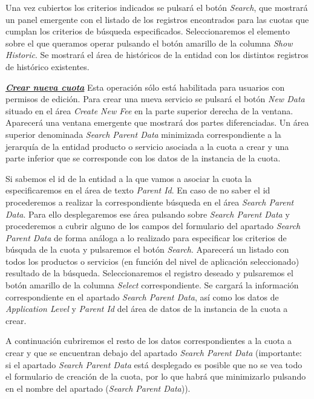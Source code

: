 Una vez cubiertos los criterios indicados se pulsará el botón \emph{Search}, que mostrará un panel emergente con el listado de los registros encontrados para las cuotas que cumplan los criterios de búsqueda especificados. Seleccionaremos el elemento sobre el que queramos operar pulsando el botón amarillo de la columna \emph{Show Historic}. Se mostrará el área de históricos de la entidad con los distintos registros de histórico existentes.


\underline{\textsl{\textbf{Crear nueva cuota}}}\newline
Esta operación sólo está habilitada para usuarios con permisos de edición.
Para crear una nueva servicio se pulsará el botón \textit{New Data} situado en el área \emph{Create New Fee} en la parte superior derecha de la ventana. Aparecerá una ventana emergente que mostrará dos partes diferenciadas. Un área superior denominada \emph{Search Parent Data} minimizada correspondiente a la jerarquía de la entidad producto o servicio asociada a la cuota a crear y una parte inferior que se corresponde con los datos de la instancia de la cuota.

Si sabemos el id de la entidad a la que vamos a asociar la cuota la especificaremos en el área de texto \emph{Parent Id}. En caso de no saber el id procederemos a realizar la correspondiente búsqueda en el área  \emph{Search Parent Data}. Para ello desplegaremos ese área pulsando sobre \emph{Search Parent Data} y procederemos a cubrir alguno de los campos del formulario del apartado \emph{Search Parent Data} de forma análoga a lo realizado para especificar los criterios de búsquda de la cuota y pulsaremos el botón \emph{Search}. Aparecerá un listado con todos los productos o servicios (en función del nivel de aplicación seleccionado) resultado de la búsqueda. Seleccionaremos el registro deseado y pulsaremos el botón amarillo de la columna \emph{Select} correspondiente. Se cargará la información correspondiente en el apartado \emph{Search Parent Data}, así como los datos de \emph{Application Level} y \emph{Parent Id} del área de datos de la instancia de la cuota a crear.

A continuación cubriremos el resto de los datos correspondientes a la cuota a crear y que se encuentran debajo del apartado \emph{Search Parent Data} (importante: si el apartado \emph{Search Parent Data} está desplegado es posible que no se vea todo el formulario de creación de la cuota, por lo que habrá que minimizarlo pulsando en el nombre del apartado (\emph{Search Parent Data})).

